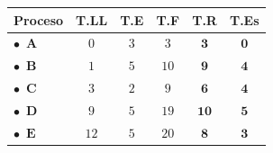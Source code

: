 \documentclass[10pt, a4paper]{article}
\begin{document}
\begin{minipage}{\linewidth}
\begin{minipage}[t]{0.275\linewidth}
\begin{tabular}{lccccc}
\textbf{Proceso} & \textbf{T.LL} & \textbf{T.E} & \textbf{T.F} & \textbf{T.R} & \textbf{T.Es} \\ \midrule
\textcolor{col0}{$\bullet$}\ \textcolor{col0}{$\mathbf{A}$} & $0$ & $3$ & $3$ & \textcolor{tr}{$\boldsymbol{3}$} & \textcolor{es}{$\boldsymbol{0}$} \\
\textcolor{col1}{$\bullet$}\ \textcolor{col1}{$\mathbf{B}$} & $1$ & $5$ & $10$ & \textcolor{tr}{$\boldsymbol{9}$} & \textcolor{es}{$\boldsymbol{4}$} \\
\textcolor{col2}{$\bullet$}\ \textcolor{col2}{$\mathbf{C}$} & $3$ & $2$ & $9$ & \textcolor{tr}{$\boldsymbol{6}$} & \textcolor{es}{$\boldsymbol{4}$} \\
\textcolor{col3}{$\bullet$}\ \textcolor{col3}{$\mathbf{D}$} & $9$ & $5$ & $19$ & \textcolor{tr}{$\boldsymbol{10}$} & \textcolor{es}{$\boldsymbol{5}$} \\
\textcolor{col4}{$\bullet$}\ \textcolor{col4}{$\mathbf{E}$} & $12$ & $5$ & $20$ & \textcolor{tr}{$\boldsymbol{8}$} & \textcolor{es}{$\boldsymbol{3}$} \\
\bottomrule\end{tabular}\\[5pt]
\hspace{2mm}
\end{minipage}
\end{minipage}
\par\vspace{0.35cm}
\end{document}
